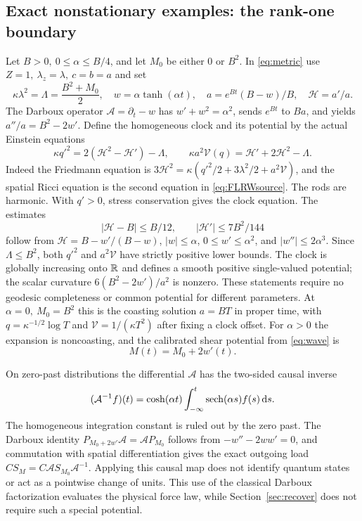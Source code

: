 \subsection{Exact nonstationary examples: the rank-one boundary}
Let \(B>0,\ 0\le\alpha\le B/4\), and let \(M_0\) be either \(0\) or \(B^2\). In \eqref{eq:metric} use \(Z=1,\ \lambda_z=\lambda,\ c=b=a\) and set
\[
 \kappa\lambda^2=\Lambda=\frac{B^2+M_0}{2},\quad
 w=\alpha\tanh(\alpha t),\quad
 a=e^{Bt}(B-w)/B,\quad \mathcal H=a'/a .
\]
The Darboux operator \(\mathcal A=\partial_t-w\) has \(w'+w^2=\alpha^2\), sends \(e^{Bt}\) to \(Ba\), and yields \(a''/a=B^2-2w'\). Define the homogeneous clock and its potential by the actual Einstein equations
\begin{equation}
 \kappa q'^2=2(\mathcal H^2-\mathcal H')-\Lambda,\qquad
 \kappa a^2\mathcal V(q)=\mathcal H'+2\mathcal H^2-\Lambda .
 \label{eq:FLRWsource}
\end{equation}
Indeed the Friedmann equation is \(3\mathcal H^2=\kappa(q'^2/2+3\lambda^2/2+a^2\mathcal V)\), and the spatial Ricci equation is the second equation in \eqref{eq:FLRWsource}. The rods are harmonic. With \(q'>0\), stress conservation gives the clock equation. The estimates
\[
 |\mathcal H-B|\le B/12,\qquad |\mathcal H'|\le 7B^2/144
\]
follow from \(\mathcal H=B-w'/(B-w)\), \(|w|\le\alpha\), \(0\le w'\le\alpha^2\), and \(|w''|\le2\alpha^3\). Since \(\Lambda\le B^2\), both \(q'^2\) and \(a^2\mathcal V\) have strictly positive lower bounds. The clock is globally increasing onto \(\mathbb R\) and defines a smooth positive single-valued potential; the scalar curvature \(6(B^2-2w')/a^2\) is nonzero. These statements require no geodesic completeness or common potential for different parameters. At \(\alpha=0,\ M_0=B^2\) this is the coasting solution \(a=BT\) in proper time, with \(q=\kappa^{-1/2}\log T\) and \(\mathcal V=1/(\kappa T^2)\) after fixing a clock offset. For \(\alpha>0\) the expansion is noncoasting, and the calibrated shear potential from \eqref{eq:wave} is
\begin{equation}
                          M(t)=M_0+2w'(t).
 \label{eq:Dmass}
\end{equation}

On zero-past distributions the differential \(\mathcal A\) has the two-sided causal inverse
\[
 (\mathcal A^{-1}f)(t)=\cosh(\alpha t)
                 \int_{-\infty}^t \operatorname{sech}(\alpha s)f(s)\,\mathrm d s.
\]
The homogeneous integration constant is ruled out by the zero past. The Darboux identity \(P_{M_0+2w'}\mathcal A=\mathcal A P_{M_0}\) follows from \(-w''-2ww'=0\), and commutation with spatial differentiation gives the exact outgoing load \(CS_M=C\mathcal A S_{M_0}\mathcal A^{-1}\). Applying this causal map does not identify quantum states or act as a pointwise change of units. This use of the classical Darboux factorization \cite{PT} evaluates the physical force law, while Section~\ref{sec:recover} does not require such a special potential.

